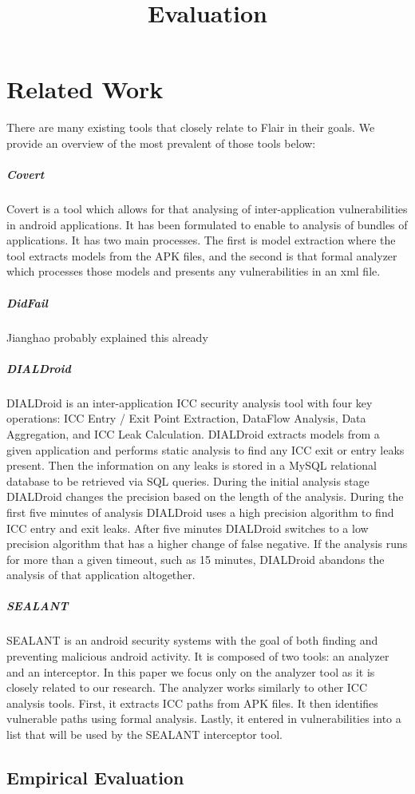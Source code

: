 \documentclass[twocolumn]{article}
\title{Evaluation}
\begin{document}
\section[1]{Related Work}
	There are many existing tools that closely relate to Flair in their goals. We provide an overview of the most prevalent of those tools below:
	\subparagraph{Covert}
		Covert is a tool which allows for that analysing of inter-application vulnerabilities in android applications. It has been formulated to enable to analysis of bundles of applications. It has two main processes. The first is model extraction where the tool extracts models from the APK files, and the second is that formal analyzer which processes those models and presents any vulnerabilities in an xml file\cite{Covert}.
	\subparagraph{DidFail}
		Jianghao probably explained this already

	\subparagraph{DIALDroid}
		DIALDroid is an inter-application ICC security analysis tool with four key operations: ICC Entry / Exit Point Extraction, DataFlow Analysis, Data Aggregation, and ICC Leak Calculation\cite{DIALDroid}. DIALDroid extracts models from a given application and performs static analysis to find any ICC exit or entry leaks present. Then the information on any leaks is stored in a MySQL relational database to be retrieved via SQL queries. During the initial analysis stage DIALDroid changes the precision based on the length of the analysis. During the first five minutes of analysis DIALDroid uses a high precision algorithm to find ICC entry and exit leaks. After five minutes DIALDroid switches to a low precision algorithm that has a higher change of false negative. If the analysis runs for more than a given timeout, such as 15 minutes, DIALDroid abandons the analysis of that application altogether\cite{DIALDroid}.
	\subparagraph{SEALANT}
		SEALANT is an android security systems with the goal of both finding and preventing malicious android activity. It is composed of two tools: an analyzer and an interceptor. In this paper we focus only on the analyzer tool as it is closely related to our research. The analyzer works similarly to other ICC analysis tools. First, it extracts ICC paths from APK files. It then identifies vulnerable paths using formal analysis. Lastly, it entered in vulnerabilities into a list that will be used by the SEALANT interceptor tool.


\begin{center}
\section[2]{Empirical Evaluation}
\end{center}
\end{document}
